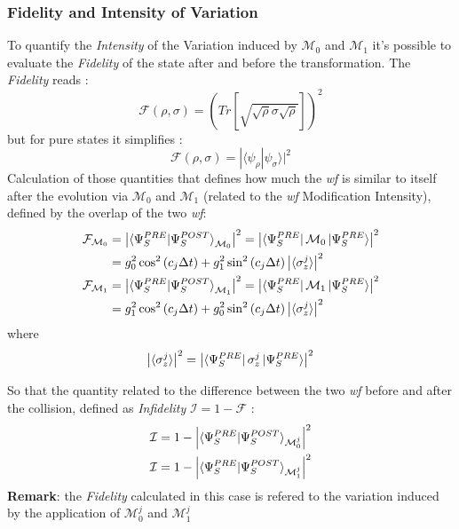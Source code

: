 \documentclass[a4paper,12pt]{article}
\begin{document}
\subsubsection{Fidelity and Intensity of Variation}
\label{subsub:Fidelity_and_Intensity_of_Variation}
To quantify the \textit{Intensity} of the Variation induced by $ \mathcal{M}_{0} $ and $ \mathcal{M}_{1} $ it's possible to evaluate the \textit{Fidelity} of the state after and before the transformation. The \textit{Fidelity} reads :
\begin{equation}
	\mathcal{F}\left( \rho, \sigma \right) = \left( Tr \left[ \sqrt{ \sqrt{\rho} \sigma \sqrt{\rho} }\right] \right)^{2}
	\label{eq:Fidelity}
\end{equation}
but for pure states it simplifies :
\begin{equation}
	\mathcal{F}\left( \rho, \sigma \right) = |\langle \psi_{\rho} | \psi_{\sigma} \rangle|^{2}
	\label{eq:Pure_Sates_Fidelity}
\end{equation}
Calculation of those quantities that defines how much the \textit{wf} is similar to itself after the evolution via $ \mathcal{M}_0 $ and $ \mathcal{M}_1 $ (related to the \textit{wf} Modification Intensity), defined by the overlap of the two \textit{wf}:
\begin{align}
	\mathcal{F}_{\mathcal{M}_{0}} &= \left| \braket{\Psi_{S}^{PRE} | \Psi_{S}^{POST}}_{\mathcal{M}_{0}} \right|^2 = \left| \bra{\Psi_{S}^{PRE}}\mathcal{M}_0 \ket{\Psi_{S}^{PRE}} \right|^2 \notag \\
	&= g_0^2 \cos^2{\left(c_j \Delta t \right)} + g_1^2 \sin^2{\left(c_j \Delta t \right)} \left| \braket{\sigma_{z}^{j}} \right|^2 \label{eq:fidelity_M0} \\
	\mathcal{F}_{\mathcal{M}_{1}} &= \left| \braket{\Psi_{S}^{PRE} | \Psi_{S}^{POST}}_{\mathcal{M}_{1}} \right|^2 = \left| \bra{\Psi_{S}^{PRE}}\mathcal{M}_1 \ket{\Psi_{S}^{PRE}} \right|^2 \notag \\
	&= g_1^2 \cos^2{\left(c_j \Delta t \right)} + g_0^2 \sin^2{\left(c_j \Delta t \right)} \left| \braket{\sigma_{z}^{j}} \right|^2 \label{eq:fidelity_M1}
\end{align}
where
\begin{equation*}
	\left| \braket{\sigma_{z}^{j}} \right|^2 = \left| \bra{\Psi_{S}^{PRE}} \sigma_{z}^{j} \ket{\Psi_{S}^{PRE}} \right|^2
\end{equation*}

So that the quantity related to the difference between the two \textit{wf} before and after the collision, defined as \textit{Infidelity} $ \mathcal{I} = 1 - \mathcal{F} $ :
\begin{align}
	\mathcal{I} = 1 - \left| \braket{\Psi_{S}^{PRE} | \Psi_{S}^{POST}}_{\mathcal{M}_{0}^{j}} \right|^2 \\
	\mathcal{I} = 1 - \left| \braket{\Psi_{S}^{PRE} | \Psi_{S}^{POST}}_{\mathcal{M}_{1}^{j}} \right|^2
\end{align}
\textbf{Remark}: the \textit{Fidelity} calculated in this case is refered to the variation induced by the application of $ \mathcal{M}_{0}^{j} $ and $ \mathcal{M}_{1}^{j} $ \\
\end{document}
